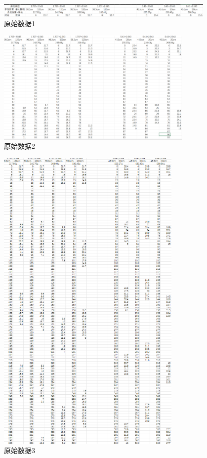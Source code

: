 \documentclass{ctexart}
\begin{document}
\begin{figure}[H]
  \centering
  \includegraphics[width=0.95\textwidth,height=0.05\textheight]{shujvchuli1.png}
  \caption{原始数据1}
\end{figure}

\begin{figure}[H]
  \centering
  \includegraphics[width=0.85\textwidth,height=0.6\textheight]{shujvchuli2.png}
  \caption{原始数据2}
\end{figure}
\newpage
\begin{figure}[H]
  \centering
  \includegraphics[width=0.8\textwidth,height=0.9\textheight]{shujvchuli3.png}
  \caption{原始数据3}
\end{figure}
\end{document}
